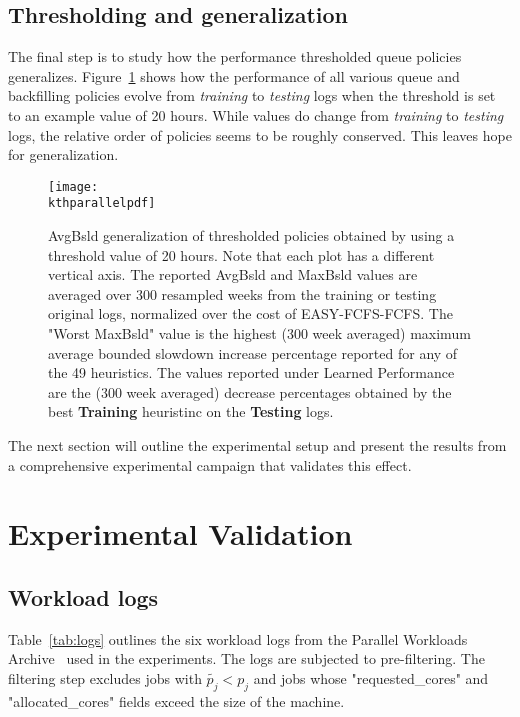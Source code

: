 \subsection{Thresholding and generalization}
\label{sec:genth}

The final step is to study how the performance thresholded queue policies
generalizes. Figure~\ref{fig:parallelkth} shows how the performance of all
various queue and backfilling policies evolve from \textit{training} to
\textit{testing} logs when the threshold is set to an example value of 20
hours. While values do change from \textit{training} to \textit{testing}
logs, the relative order of policies seems to be roughly conserved. This
leaves hope for generalization.

\begin{figure}[ht!]
  \centering
  \texttt{[image: \\kthparallelpdf]}

  \caption{AvgBsld generalization of thresholded policies obtained by using a
    threshold value of 20 hours. Note that each plot has a different vertical
    axis. The reported AvgBsld and MaxBsld values are averaged over 300
    resampled weeks from the training or testing original logs, normalized over
    the cost of EASY-FCFS-FCFS. The "Worst MaxBsld" value is the highest (300
    week averaged) maximum average bounded slowdown increase percentage
    reported for any of the 49 heuristics. The values reported under Learned
    Performance are the (300 week averaged) decrease percentages obtained by the
    best \textbf{Training} heuristinc on the \textbf{Testing} logs.}

  \label{fig:parallelkth}
\end{figure}

The next section will outline the experimental setup and present the results
from a comprehensive experimental campaign that validates this effect.

\section{Experimental Validation}

\subsection{Workload logs}

Table~\ref{tab:logs} outlines the six workload logs from the Parallel
Workloads Archive~\cite{Feitelson20142967} used in the experiments. The logs
are subjected to pre-filtering. The filtering step excludes jobs with
$\widetilde{p_j} < p_j $ and jobs whose "requested\_cores" and "allocated\_cores"
fields exceed the size of the machine.

